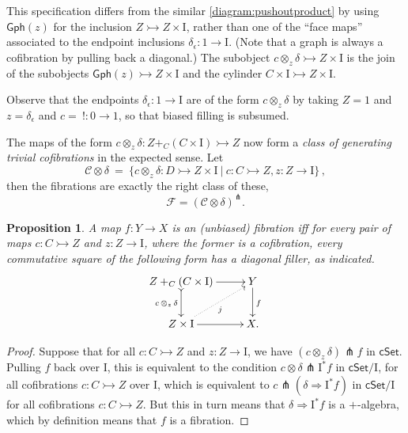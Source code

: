 \documentclass[12pt]{article}
\newcommand{\cSet}{\ensuremath{\mathsf{cSet}}}
\newcommand{\mono}{\ensuremath{\rightarrowtail}}
\newcommand{\ra}{\ensuremath{\rightarrow}}
\newcommand{\I}{\ensuremath{\mathrm{I}}}
\newtheorem{proposition}[theorem]{Proposition}
\theoremstyle{remark}
\theoremstyle{definition}
\begin{document}
This specification differs from the similar \eqref{diagram:pushoutproduct} by using $\mathsf{Gph}(z)$ for the inclusion $Z\mono Z\times\I$, rather than one of the ``face maps'' associated to the endpoint inclusions $\delta_\epsilon : 1\ra\I$. (Note that a graph is always a cofibration by pulling back a diagonal.)  The subobject $c \otimes_z\!\delta \mono Z\times \I$ is the join of the subobjects $\mathsf{Gph}(z) \mono Z\times \I$ and the cylinder $C\times \I \mono Z\times \I$.

Observe that the endpoints $\delta_\epsilon : 1 \ra \I$ are of the form $c \otimes_z\!\delta$ by taking $Z = 1$ and $z = \delta_\epsilon$ and $c =\ ! : 0 \ra 1$, so that biased filling is subsumed. 

The maps of the form $c\otimes_z\delta : Z +_C (C\times\I) \mono Z$  now form a \emph{class of generating trivial cofibrations} in the expected sense.  Let 
\begin{equation}\label{eq:generatingtrivialcofibrations}
\mathcal{C}\otimes\delta\ =\ \{ c \otimes_z \delta : D \mono Z \times \I\ |\ c : C\mono Z, z:Z\ra\I \}\,,
\end{equation}
then the fibrations are exactly the right class of these,
\[
\mathcal{F} = (\mathcal{C}\otimes\delta)^{\pitchfork}.
\]
\begin{proposition}\label{prop:fibiffrlp}
A map $f: Y\ra X$ is an (unbiased) fibration iff for every pair of maps $c : C\mono Z$ and $z:Z\ra\I$, where the former is a cofibration, every commutative square of the following form has a diagonal filler, as indicated.
\begin{equation}\label{diagram:unbiasedfibration}
\xymatrix{
Z +_C (C\times\I) \ar@{>->}[d]_{c\, \otimes_z\, \delta} \ar[r] & Y \ar[d]^f \\
Z\times \I \ar@{.>}[ru]_{j} \ar[r] & X.
}
\end{equation}
\end{proposition}

\begin{proof}
Suppose that for all $c : C\mono Z$ and $z:Z\ra\I$, we have $(c\otimes_z\delta) \pitchfork f$ in $\cSet$. Pulling $f$ back over $\I$, this is equivalent to the condition $c\otimes\delta \pitchfork \I^*f$ in $\cSet/\I$, for all cofibrations $c : C\mono Z$ over $\I$, which is equivalent to $c\pitchfork(\delta\Rightarrow \I^*f)$ in $\cSet/\I$ for all cofibrations $c : C\mono Z$.  But this in turn means that $\delta\Rightarrow\I^*f$ is a $+$-algebra, which by definition means that $f$ is a fibration.
\end{proof}
\end{document}
